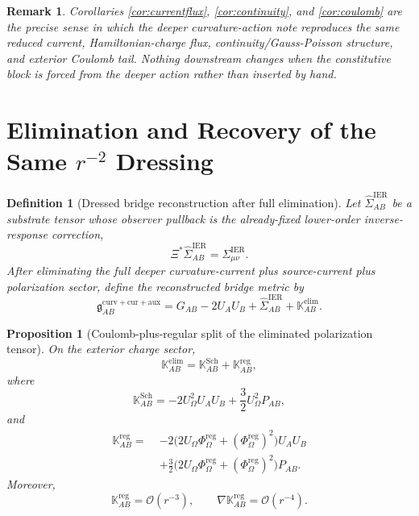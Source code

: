 \documentclass[11pt]{article}
\newcommand{\BridgeMetric}{\mathfrak g}
\newcommand{\ObserverMap}{\Xi}
\newcommand{\ProjSub}{P}
\newcommand{\FlowPotReg}{\Phi_\Omega^{\mathrm{reg}}}
\newcommand{\CoulPot}{U_\Omega}
\newcommand{\SigmaIER}{\Sigma^{\mathrm{IER}}}
\newcommand{\LiftIER}{\widehat\Sigma^{\mathrm{IER}}}
\newcommand{\AuxPol}{\mathbb K}
\newtheorem{definition}{Definition}
\newtheorem{proposition}{Proposition}
\newtheorem{remark}{Remark}
\begin{document}
\begin{remark}
Corollaries \ref{cor:currentflux}, \ref{cor:continuity}, and \ref{cor:coulomb} are the precise sense in which the deeper curvature-action note reproduces the same reduced current, Hamiltonian-charge flux, continuity/Gauss-Poisson structure, and exterior Coulomb tail. Nothing downstream changes when the constitutive block is forced from the deeper action rather than inserted by hand.
\end{remark}

\section{Elimination and Recovery of the Same \texorpdfstring{\(r^{-2}\)}{r^-2} Dressing}

\begin{definition}[Dressed bridge reconstruction after full elimination]
\label{def:bridge}
Let \(\LiftIER_{AB}\) be a substrate tensor whose observer pullback is the already-fixed lower-order inverse-response correction,
\begin{equation}
\ObserverMap^\ast\LiftIER_{AB}=\SigmaIER_{\mu\nu}.
\label{eq:liftier}
\end{equation}
After eliminating the full deeper curvature-current plus source-current plus polarization sector, define the reconstructed bridge metric by
\begin{equation}
\BridgeMetric_{AB}^{\mathrm{curv+cur+aux}}
=
G_{AB}
-2U_AU_B
+\LiftIER_{AB}
+\AuxPol_{AB}^{\mathrm{elim}}.
\label{eq:bridge}
\end{equation}
\end{definition}

\begin{proposition}[Coulomb-plus-regular split of the eliminated polarization tensor]
\label{prop:split}
On the exterior charge sector,
\begin{equation}
\AuxPol_{AB}^{\mathrm{elim}}
=
\AuxPol_{AB}^{\mathrm{Sch}}
+\AuxPol_{AB}^{\mathrm{reg}},
\label{eq:Ksplit}
\end{equation}
where
\begin{equation}
\AuxPol_{AB}^{\mathrm{Sch}}
=
-2\CoulPot^2U_AU_B
+\frac32\CoulPot^2\ProjSub_{AB},
\label{eq:Ksch}
\end{equation}
and
\begin{align}
\AuxPol_{AB}^{\mathrm{reg}}
=\;&
-2\bigl(2\CoulPot\FlowPotReg+(\FlowPotReg)^2\bigr)U_AU_B
\nonumber\\
&+\frac32\bigl(2\CoulPot\FlowPotReg+(\FlowPotReg)^2\bigr)\ProjSub_{AB}.
\label{eq:Kreg}
\end{align}
Moreover,
\begin{equation}
\AuxPol_{AB}^{\mathrm{reg}}=\mathcal O(r^{-3}),
\qquad
\nabla\AuxPol_{AB}^{\mathrm{reg}}=\mathcal O(r^{-4}).
\label{eq:Kregdecay}
\end{equation}
\end{proposition}
\end{document}
